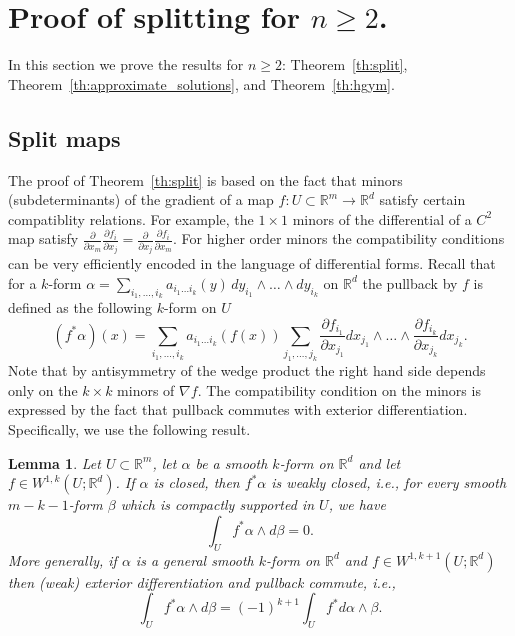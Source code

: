 \documentclass[titlepage]{amsart}
\numberwithin{equation}{section}
\theoremstyle{plain}
\newtheorem{lemma}[equation]{Lemma}
\theoremstyle{definition}
\theoremstyle{remark}
\newcommand{\R}{\mathbb{R}}
\newcommand{\g}{\nabla }
\begin{document}
\section{Proof of  splitting for $n \ge 2$.}  \label{se:split}

In this section we prove the results for $n \ge 2$: Theorem~\ref{th:split},  Theorem~\ref{th:approximate_solutions}, 
and Theorem~\ref{th:hgym}.



\subsection{Split maps}
The proof  of 
Theorem~\ref{th:split} is based on the
fact that minors (subdeterminants) of the gradient of a map $f : U \subset
\R^m \to \R^d$ satisfy certain compatiblity relations. For example, the
$1\times 1$ minors of the differential of  a $C^2$ map  satisfy 
$ \frac{\partial}{\partial x_m} \frac{\partial f_i}{\partial x_j} =  \frac{\partial}{\partial x_j} \frac{\partial f_i}{\partial x_m}$.
For higher order
minors the compatibility conditions can be very efficiently encoded in the language of differential forms. 
Recall that for a $k$-form $\alpha  = \sum_{i_1, \ldots, i_k} a_{i_1 \ldots i_k}(y) \, dy_{i_1} \wedge \ldots \wedge dy_{i_k}$
on $\R^d$ the pullback by $f$ is defined as the following $k$-form on $U$
$$
(f^* \alpha)(x) = \sum_{i_1, \ldots, i_k} a_{i_1 \ldots i_k}(f(x))  \sum_{j_1, \ldots, j_k} 
\frac{\partial f_{i_1}}{\partial x_{j_1}} dx_{j_1} \wedge \ldots \wedge \frac{\partial f_{i_k}}{\partial x_{j_k}} dx_{j_k}.
$$
Note that by antisymmetry of the wedge product the right hand side depends only on the $k \times  k$ minors of $\g f$. 
The compatibility condition on the minors is expressed by the fact that pullback commutes with exterior differentiation. Specifically,
 we use the following result.
 
\begin{lemma}  \label{le:pullback_closed}
 Let $U \subset  \R^m$, let $\alpha$  be a smooth $k$-form on $\R^d$ and let $f \in W^{1,k}(U;\R^d)$. If $\alpha$  is closed, then $f^* \alpha$ is weakly closed, i.e., for every smooth $m -k-1$-form
  $\beta$ which is compactly supported in $U$, we have
  \begin{equation}
  \int_U f^* \alpha \wedge d\beta = 0.
  \end{equation}
 More generally, if $\alpha$ is a general smooth $k$-form on $\R^d$ and $f \in W^{1,k+1}(U;\R^d)$
  then (weak)  exterior differentiation and pullback commute, i.e.,
  \begin{equation}
  \int_U f^* \alpha \wedge d\beta = (-1)^{k+1} \int_U  f^*d\alpha \wedge \beta.
  \end{equation}
  \end{lemma}
\end{document}
